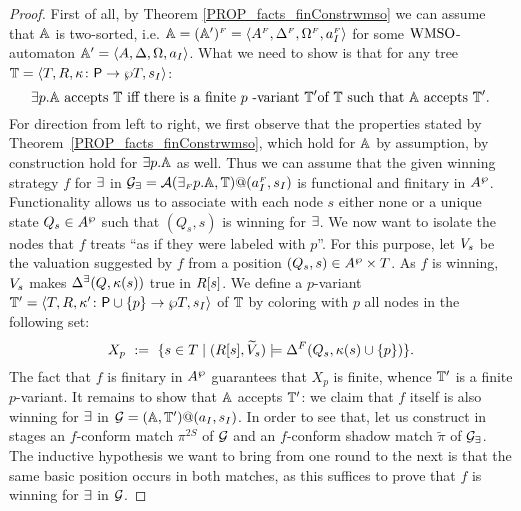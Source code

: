 \begin{proof}
First of all, by Theorem \ref{PROP_facts_finConstrwmso} we can assume that $\mathbb{A}$ is two-sorted, i.e. $\mathbb{A} = (\mathbb{A}')^{{\scriptscriptstyle F}} = \langle{A^{{\scriptscriptstyle F}}, \Delta^{{\scriptscriptstyle F}},\Omega^{{\scriptscriptstyle F}},a_I^{{\scriptscriptstyle F}}}\rangle$ for some $\mathrm{WMSO}$-automaton $\mathbb{A}' = \langle{A,\Delta,\Omega, a_I}\rangle$. What we need to show is that for any tree $\mathbb{T} = \langle{T,R,\kappa\colon \mathsf{P}\to \wp T,s_I}\rangle$:
$${{\exists} p}.\aut \text{ accepts } \bbT \text{ iff } \text{there is a finite }p \text{ -variant }\bbT' \text{of } \bbT \text{  such that } \aut \text{  accepts } \bbT'.$$
For direction from left to right, we first observe that the properties stated by Theorem~\ref{PROP_facts_finConstrwmso}, which hold for $\mathbb{A}$ by assumption, by construction hold for ${{\exists} p}.\mathbb{A}$ as well. Thus we can assume that the given winning strategy $f$ for $\exists$ in $\mathcal{G_{\exists}} = \mathcal{A}({\exists_{{\scriptscriptstyle F}} p}.\mathbb{A},\mathbb{T})@(a_I^{{\scriptscriptstyle F}},s_I)$ is functional and finitary in $A^{\wp}$. Functionality allows us to associate with each node $s$ either none or a unique state $Q_s \in A^{\wp}$ such that $(Q_s,s)$ is winning for $\exists$. We now want to isolate the nodes that $f$ treats ``as if they were labeled with $p$''. For this purpose, let $V_{s}$ be the valuation suggested by $f$ from a position $(Q_s,s) \in A^{\wp} \times T$. As $f$ is winning, $V_{s}$ makes $\Delta^\exists(Q,\kappa(s))$ true in $R[s]$. We define a $p$-variant $\mathbb{T}' = \langle{T,R,\kappa' \colon \mathsf{P}\cup\{p\} \to \wp T,s_I}\rangle$ of $\mathbb{T}$ by coloring with $p$ all nodes in the following set:
 \begin{equation}\label{eq:X_p}
   X_p\ :=\ \{s \in T\mid (\R{s},\widetilde{\val}_{s}) \models \tmap^{\f}(Q_s,\tscolors(s)\cup\{p\})\}.
\end{equation}
The fact that $f$ is finitary in $A^{\wp}$ guarantees that $X_p$ is finite, whence $\mathbb{T}'$ is a finite $p$-variant. It remains to show that $\mathbb{A}$ accepts $\mathbb{T}'$: we claim that $f$ itself is also winning for $\exists$ in $\mathcal{G} = (\mathbb{A},\mathbb{T}')@(a_I,s_I)$. In order to see that, let us construct in stages an $f$-conform match $\pi^{2S}$ of $\mathcal{G}$ and an $f$-conform shadow match $\tilde{\pi}$ of $\mathcal{G_{\exists}}$. The inductive hypothesis we want to bring from one round to the next is that the same basic position occurs in both matches, as this suffices to prove that $f$ is winning for $\exists$ in $\mathcal{G}$.


\end{proof}

